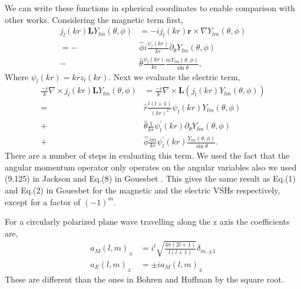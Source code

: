\documentclass[aps,prl,twocolumn]{revtex4-1}
\begin{document}
We can write these functions in spherical coordinates to enable comparison
with other works. Considering the magnetic term first,
\begin{align}
  \label{eq:magneticVSH}
  j_l(kr) \mathbf{L} Y_{lm}(\theta,\phi) &= 
                -i j_l(kr) \mathbf{r} \times \nabla Y_{lm}(\theta,\phi) \\
               =  
        -&\hat{\phi}i\frac{ \psi_l(kr)}{kr} \partial_\theta Y_{lm}(\theta,\phi)  \\
   - &\hat{\theta}\frac{ \psi_l(kr)}{kr} \frac{m Y_{lm}(\theta,\phi)}
                                         {\sin \theta},
\end{align}
Where $\psi_l(kr) = kr z_l(kr)$.
Next we evaluate the electric term,
\begin{align}
  \label{eq:electricVSH}
  \frac{-i}{k} \nabla \times j_l(kr) \mathbf{L} Y_{lm}(\theta,\phi) &=
        \frac{-i}{k} \nabla \times \mathbf{L}(j_l(kr) Y_{lm}(\theta,\phi)) \\   
       = &\hat{r} \frac{l(l+1)}{(kr)^2}\psi_l(kr)Y_{lm}(\theta,\phi) \\
         +&\hat{\theta} \frac{1}{kr} \psi_l^\prime(kr)
                       \partial_\theta Y_{lm}(\theta,\phi) \\
         +&\hat{\phi} \frac{i m}{kr} \psi_l^\prime(kr)
                       \frac{ Y_{lm}(\theta,\phi)}{\sin \theta}.
\end{align}
There are a number of steps in evaluating this term. We used the fact that
the angular momentum operator only operates on the angular variables
also we used (9.125) in Jackson and Eq.(8) in 
Gouesbet \cite{gouesbet_t-matrix_2010}. This gives the same result
as Eq.(1) and Eq.(2) in Gouesbet for the magnetic and the electric VSHs
respectively, except for a factor of $(-1)^m$.

For a circularly polarized plane wave travelling along the
z axis the coefficients are,
\begin{align}
  \label{eq:coefficients}
  a_M(l,m)_\pm &= i^l \sqrt{\frac{4 \pi (2 l+1)}{l (l+1)}} \delta_{m,\pm1} \\
  a_E(l,m)_\pm &= \pm i  a_M(l,m)_\pm
\end{align} 
These are different than the ones in Bohren and Huffman by the square root.
\end{document}
